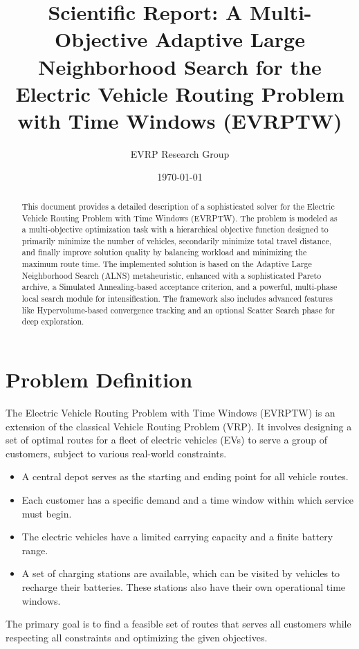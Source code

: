 \documentclass[a4paper,12pt]{article}
\title{\textbf{Scientific Report: A Multi-Objective Adaptive Large Neighborhood Search for the Electric Vehicle Routing Problem with Time Windows (EVRPTW)}}
\author{EVRP Research Group}
\date{\today}
\begin{document}
\maketitle

\begin{abstract}
This document provides a detailed description of a sophisticated solver for the Electric Vehicle Routing Problem with Time Windows (EVRPTW). The problem is modeled as a multi-objective optimization task with a hierarchical objective function designed to primarily minimize the number of vehicles, secondarily minimize total travel distance, and finally improve solution quality by balancing workload and minimizing the maximum route time. The implemented solution is based on the Adaptive Large Neighborhood Search (ALNS) metaheuristic, enhanced with a sophisticated Pareto archive, a Simulated Annealing-based acceptance criterion, and a powerful, multi-phase local search module for intensification. The framework also includes advanced features like Hypervolume-based convergence tracking and an optional Scatter Search phase for deep exploration.
\end{abstract}

\section{Problem Definition}

The Electric Vehicle Routing Problem with Time Windows (EVRPTW) is an extension of the classical Vehicle Routing Problem (VRP). It involves designing a set of optimal routes for a fleet of electric vehicles (EVs) to serve a group of customers, subject to various real-world constraints.
\begin{itemize}
    \item A central depot serves as the starting and ending point for all vehicle routes.
    \item Each customer has a specific demand and a time window within which service must begin.
    \item The electric vehicles have a limited carrying capacity and a finite battery range.
    \item A set of charging stations are available, which can be visited by vehicles to recharge their batteries. These stations also have their own operational time windows.
\end{itemize}
The primary goal is to find a feasible set of routes that serves all customers while respecting all constraints and optimizing the given objectives.
\end{document}
